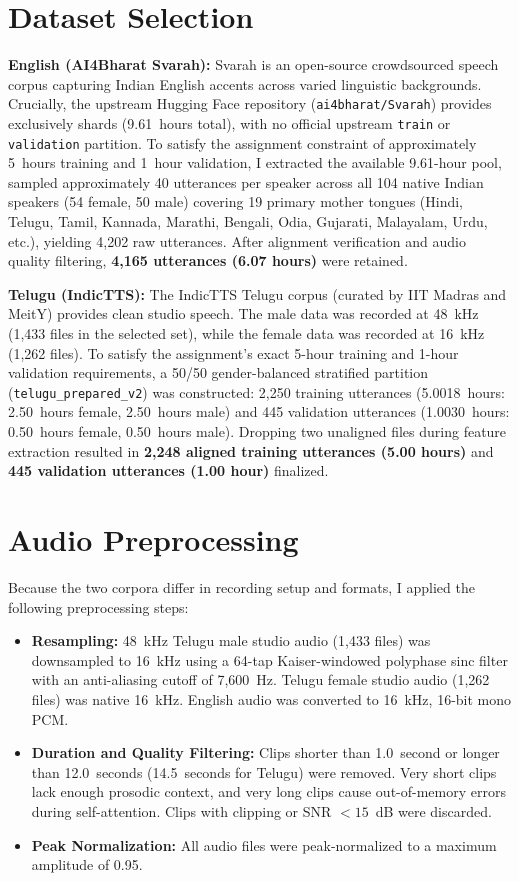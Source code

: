 \documentclass[11pt,a4paper]{report}
\begin{document}
\section{Dataset Selection}
\textbf{English (AI4Bharat Svarah):} Svarah is an open-source crowdsourced speech corpus capturing Indian English accents across varied linguistic backgrounds. Crucially, the upstream Hugging Face repository (\texttt{ai4bharat/Svarah}) provides exclusively  shards (9.61~hours total), with no official upstream \texttt{train} or \texttt{validation} partition. To satisfy the assignment constraint of approximately 5~hours training and 1~hour validation, I extracted the available 9.61-hour pool, sampled approximately 40 utterances per speaker across all 104 native Indian speakers (54 female, 50 male) covering 19 primary mother tongues (Hindi, Telugu, Tamil, Kannada, Marathi, Bengali, Odia, Gujarati, Malayalam, Urdu, etc.), yielding 4{,}202 raw utterances. After alignment verification and audio quality filtering, \textbf{4{,}165 utterances (6.07 hours)} were retained.

\textbf{Telugu (IndicTTS):} The IndicTTS Telugu corpus (curated by IIT Madras and MeitY) provides clean studio speech. The male data was recorded at 48~kHz (1{,}433 files in the selected set), while the female data was recorded at 16~kHz (1{,}262 files). To satisfy the assignment's exact 5-hour training and 1-hour validation requirements, a 50/50 gender-balanced stratified partition (\texttt{telugu\_prepared\_v2}) was constructed: 2{,}250 training utterances (5.0018~hours: 2.50~hours female, 2.50~hours male) and 445 validation utterances (1.0030~hours: 0.50~hours female, 0.50~hours male). Dropping two unaligned files during feature extraction resulted in \textbf{2{,}248 aligned training utterances (5.00 hours)} and \textbf{445 validation utterances (1.00 hour)} finalized.

\section{Audio Preprocessing}
Because the two corpora differ in recording setup and formats, I applied the following preprocessing steps:
\begin{itemize}
    \item \textbf{Resampling:} 48~kHz Telugu male studio audio (1{,}433 files) was downsampled to 16~kHz using a 64-tap Kaiser-windowed polyphase sinc filter with an anti-aliasing cutoff of 7{,}600~Hz. Telugu female studio audio (1{,}262 files) was native 16~kHz. English audio was converted to 16~kHz, 16-bit mono PCM.
    \item \textbf{Duration and Quality Filtering:} Clips shorter than 1.0~second or longer than 12.0~seconds (14.5~seconds for Telugu) were removed. Very short clips lack enough prosodic context, and very long clips cause out-of-memory errors during self-attention. Clips with clipping or SNR $<15$~dB were discarded.
    \item \textbf{Peak Normalization:} All audio files were peak-normalized to a maximum amplitude of 0.95.
\end{itemize}
\end{document}
